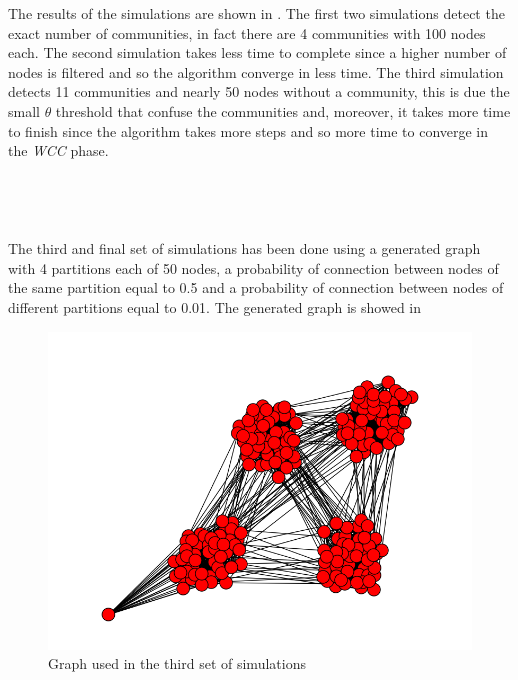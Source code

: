 \documentclass[12pt]{article}
\begin{document}
 The results of the simulations are shown in . The first two simulations detect the exact number of communities, in fact there are 4 communities with 100 nodes each. The second simulation takes less time to complete since a higher number of nodes is filtered and so the algorithm converge in less time. The third simulation detects 11 communities and nearly 50 nodes without a community, this is due the small $\theta$ threshold that confuse the communities and, moreover, it takes more time to finish since the algorithm takes more steps and so more time to converge in the \emph{WCC} phase.
\\
\\
\\
\\
\\
The third and final set of simulations has been done using a generated graph  with 4 partitions each of 50 nodes, a probability of connection between nodes of the same partition equal to 0.5 and a probability of connection between nodes of different partitions equal to 0.01. The generated graph is showed in 
     \begin{figure}[H]
       \centering
         \includegraphics[width=1\textwidth]{Graph200.png}
       \caption{Graph used in the third set of simulations}
       \label{fig:Graph200}
     \end{figure}
\end{document}
